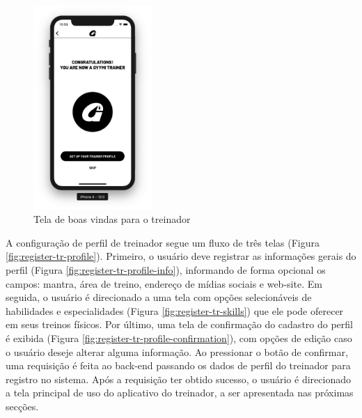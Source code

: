 \begin{figure}[h]
    \centering
    \includegraphics[width=0.4\textwidth]{pfc/figuras/tr-congratulations.png}
    \caption{Tela de boas vindas para o treinador}
    \label{fig:tr-welcome}
\end{figure}

A configuração de perfil de treinador segue um fluxo de três telas (Figura \ref{fig:register-tr-profile}). Primeiro, o usuário deve registrar as informações gerais do perfil (Figura \ref{fig:register-tr-profile-info}), informando de forma opcional os campos: mantra, área de treino, endereço de mídias sociais e web-site. Em seguida, o usuário é direcionado a uma tela com opções selecionáveis de habilidades e especialidades (Figura \ref{fig:register-tr-skills}) que ele pode oferecer em seus treinos físicos. Por último, uma tela de confirmação do cadastro do perfil é exibida (Figura \ref{fig:register-tr-profile-confirmation}), com opções de edição caso o usuário deseje alterar alguma informação. Ao pressionar o botão de confirmar, uma requisição é feita ao back-end passando os dados de perfil do treinador para registro no sistema. Após a requisição ter obtido sucesso, o usuário é direcionado a tela principal de uso do aplicativo do treinador, a ser apresentada nas próximas secções.

